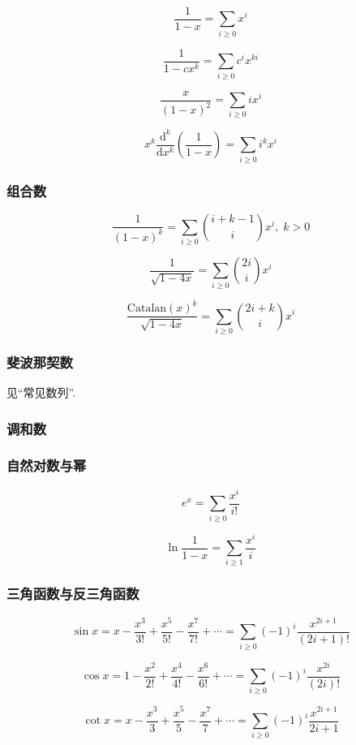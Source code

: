$$\frac 1 {1 - x} = \sum_{i \ge 0} x ^ i$$

$$\frac 1 {1 - c x ^ k} = \sum_{i \ge 0} c ^ i x ^ {k i}$$

$$\frac x {(1 - x) ^ 2} = \sum_{i \ge 0} i x ^ i$$

$$x ^ k \frac {\mathrm{d} ^ k} {\mathrm{d} x ^ k} \left( \frac 1 {1 - x} \right) = \sum_{i \ge 0} i ^ k x ^ i$$

\subsubsection{组合数}

$$\frac 1 {(1 - x) ^ k} = \sum_{i \ge 0} {i + k - 1 \choose i} x ^ i, \; k > 0$$

$$\frac 1 {\sqrt {1 - 4x}} = \sum_{i \ge 0} {2i \choose i} x ^ i$$

$$\frac {\mathrm{Catalan}(x) ^ k} {\sqrt {1 - 4x}} = \sum_{i \ge 0} {2i + k \choose i} x ^ i$$

\subsubsection{斐波那契数}

见``常见数列''.

\subsubsection{调和数}

\subsubsection{自然对数与幂}

$$e ^ x = \sum_{i \ge 0} \frac {x ^ i} {i!}$$

$$\ln \frac 1 {1 - x} = \sum_{i \ge 1} \frac {x ^ i} i$$

\subsubsection{三角函数与反三角函数}

$$\sin x = x - \frac {x ^ 3} {3!} + \frac {x ^ 5} {5!} - \frac {x ^ 7} {7!} + \cdots = \sum_{i \ge 0} (-1) ^ i \frac {x ^ {2 i + 1}} {(2 i + 1)!}$$

$$\cos x = 1 - \frac {x ^ 2} {2!} + \frac {x ^ 4} {4!} - \frac {x ^ 6} {6!} + \cdots = \sum_{i \ge 0} (-1) ^ i \frac {x ^ {2 i}} {(2 i)!}$$

$$\cot x = x - \frac {x ^ 3} 3 + \frac {x ^ 5} 5 - \frac {x ^ 7} 7 + \cdots = \sum_{i \ge 0} (-1) ^ i \frac {x ^ {2 i + 1}} {2 i + 1}$$